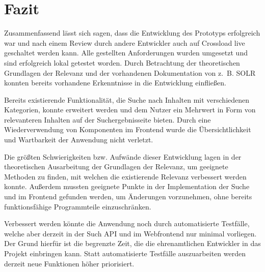 \chapter{Fazit}
\label{ch:summary}

Zusammenfassend lässt sich sagen, dass die Entwicklung des Prototyps erfolgreich war und nach einem Review durch andere Entwickler auch auf Crossload live geschaltet werden kann.
Alle gestellten Anforderungen wurden umgesetzt und sind erfolgreich lokal getestet worden.
Durch Betrachtung der theoretischen Grundlagen der Relevanz und der vorhandenen Dokumentation von z. B. SOLR konnten bereits vorhandene Erkenntnisse in die Entwicklung einfließen.

Bereits existierende Funktionalität, die Suche nach Inhalten mit verschiedenen Kategorien, konnte erweitert werden und dem Nutzer ein Mehrwert in Form von relevanteren Inhalten auf der Suchergebnisseite bieten.
Durch eine Wiederverwendung von Komponenten im Frontend wurde die Übersichtlichkeit und Wartbarkeit der Anwendung nicht verletzt.

Die größten Schwierigkeiten bzw. Aufwände dieser Entwicklung lagen in der theoretischen Ausarbeitung der Grundlagen der Relevanz, um geeignete Methoden zu finden, mit welchen die existierende Relevanz verbessert werden konnte.
Außerdem mussten geeignete Punkte in der Implementation der Suche und im Frontend gefunden werden, um Änderungen vorzunehmen, ohne bereits funktionsfähige Programmteile einzuschränken.

Verbessert werden könnte die Anwendung noch durch automatisierte Testfälle, welche aber derzeit in der Such API und im Webfrontend nur minimal vorliegen.
Der Grund hierfür ist die begrenzte Zeit, die die ehrenamtlichen Entwickler in das Projekt einbringen kann.
Statt automatisierte Testfälle auszuarbeiten werden derzeit neue Funktionen höher priorisiert.
